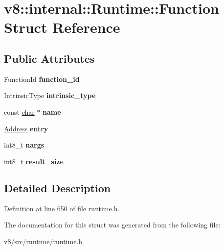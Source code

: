 \hypertarget{structv8_1_1internal_1_1Runtime_1_1Function}{}\section{v8\+:\+:internal\+:\+:Runtime\+:\+:Function Struct Reference}
\label{structv8_1_1internal_1_1Runtime_1_1Function}
\subsection*{Public Attributes}
\begin{DoxyCompactItemize}
\item 
\mbox{\label{structv8_1_1internal_1_1Runtime_1_1Function_a713ac5d134215cd5c1e4e4414a530e63}} 
Function\+Id {\bfseries function\+\_\+id}
\item 
\mbox{\label{structv8_1_1internal_1_1Runtime_1_1Function_aa1d4b01b27002015b6148f7097cee1ad}} 
Intrinsic\+Type {\bfseries intrinsic\+\_\+type}
\item 
\mbox{\label{structv8_1_1internal_1_1Runtime_1_1Function_a8d7a71e9b81c63cef8006a5e8580745f}} 
const \mbox{\hyperlink{classchar}{char}} $\ast$ {\bfseries name}
\item 
\mbox{\label{structv8_1_1internal_1_1Runtime_1_1Function_a9c2bb17d76a986835dcf43412bf5d3d0}} 
\mbox{\hyperlink{classuintptr__t}{Address}} {\bfseries entry}
\item 
\mbox{\label{structv8_1_1internal_1_1Runtime_1_1Function_a4b74b29f3dea1980d8e18d6bddb1f49b}} 
int8\+\_\+t {\bfseries nargs}
\item 
\mbox{\label{structv8_1_1internal_1_1Runtime_1_1Function_a47a801f6f15127121bac4e780bbb5e5f}} 
int8\+\_\+t {\bfseries result\+\_\+size}
\end{DoxyCompactItemize}


\subsection{Detailed Description}


Definition at line 650 of file runtime.\+h.



The documentation for this struct was generated from the following file\+:\begin{DoxyCompactItemize}
\item 
v8/src/runtime/runtime.\+h\end{DoxyCompactItemize}
